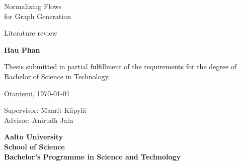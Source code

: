 {\parindent0pt %
	\begin{spacing}{1.1}

		 {\sffamily\lsstyle \the\year}
	\end{spacing}

	\vspace{12.7mm}

	\begin{spacing}{1.63}
		{\fontsize{17.8pt}{17.8pt}\selectfont Normalizing Flows \\for Graph Generation}
	\end{spacing}

	\vspace{10.5mm}

	\begin{spacing}{1.2}
		{\fontsize{13pt}{13pt}\selectfont Literature review}
	\end{spacing}

	\vspace{10.6mm}

	{\fontsize{13.9pt}{13.9pt}\bfseries\sffamily\lsstyle Hau Phan}

	\vfill

	{\fontsize{10.3pt}{10.3pt}\sffamily\lsstyle\raggedright
		\begin{spacing}{1.06}

			Thesis submitted in partial fulfillment of the requirements for the
			degree of Bachelor of Science in Technology.

			Otaniemi, \today

			\begin{tabbing}
				Supervisor:\hspace{6mm} \= Maarit Käpylä \\
				Advisor: \> Anirudh Jain
			\end{tabbing}
			\vspace{-4mm}
		\end{spacing}
	} %

	\vspace{11.5mm}

	\begin{spacing}{.9}
		{\bfseries\sffamily\lsstyle Aalto University \\
			School of Science \\
			Bachelor’s Programme in Science and Technology}
	\end{spacing}
} %



